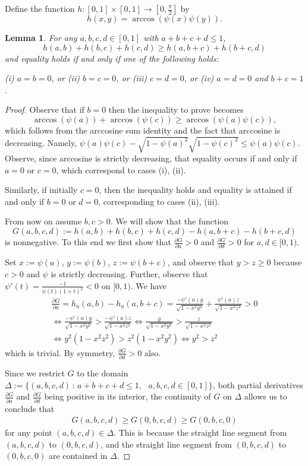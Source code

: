 \documentclass[reqno,hidelinks,11pt]{amsart}
\numberwithin{equation}{section}
\newtheorem{lemma}[theorem]{Lemma}
\begin{document}
Define the function $h:[0,1]\times[0,1]\to[0,\frac{\pi}{2}]$ by
\[
h(x,y)=\arccos(\psi(x)\psi(y)).
\]

\begin{lemma}\label{lemma: arccos triangle ieq}
    For any $a,b,c,d\in[0,1]$ with $a+b+c+d\le1$,
    \[
    h(a,b)+h(b,c)+h(c,d)\ge h(a,b+c)+h(b+c,d)
    \]
    and equality holds if and only if one of the following holds: 
    \begin{center}
    (i) $a=b=0$, or (ii) $b=c=0$, or (iii) $c=d=0$, or (iv) $a=d=0$ and $b+c=1$.
    \end{center}
\end{lemma}
\begin{proof}
Observe that if $b=0$ then the inequality to prove becomes 
\[
\arccos(\psi(a))+\arccos(\psi(c))\ge\arccos(\psi(a)\psi(c)),
\] 
which follows from the arccosine sum identity and the fact that arccosine is decreasing. Namely, $\psi(a)\psi(c)-\sqrt{1-\psi(a)^2}\sqrt{1-\psi(c)^2}\le \psi(a)\psi(c)$. Observe, since arccosine is strictly decreasing, that equality occurs if and only if $a=0$ or $c=0$, which correspond to cases (i), (ii). 

Similarly, if initially $c=0$, then the inequality holds and equality is attained if and only if $b=0$ or $d=0$, corresponding to cases (ii), (iii). 

From now on assume $b,c>0$. We will show that the function 
\[
G(a,b,c,d):=h(a,b)+h(b,c)+h(c,d)-h(a,b+c)-h(b+c,d)
\]
is nonnegative. To this end we first show that $\frac{\partial G}{\partial a}>0$ and $\frac{\partial G}{\partial d}>0$ for $a,d\in[0,1)$.

Set $x:=\psi(a)$, $y:=\psi(b)$, $z:=\psi(b+c)$, and observe that $y>z\ge0$ because $c>0$ and $\psi$ is strictly decreasing. Further, observe that $\psi'(t)=\frac{-1}{\psi(t)(1+t)^2}<0$ on $[0,1)$. We have
\begin{align*}
\frac{\partial G}{\partial a}=h_a(a,b)-h_a(a,b+c)=\frac{-\psi'(a)y}{\sqrt{1-x^2y^2}}+\frac{\psi'(a)z}{\sqrt{1-x^2z^2}}>0\\
\Leftrightarrow \frac{-\psi'(a)y}{\sqrt{1-x^2y^2}}>\frac{-\psi'(a)z}{\sqrt{1-x^2z^2}}
\Leftrightarrow \frac{y}{\sqrt{1-x^2y^2}}>\frac{z}{\sqrt{1-x^2z^2}}\\
\Leftrightarrow y^2(1-x^2z^2)>z^2(1-x^2y^2)
\Leftrightarrow y^2>z^2
\end{align*}
which is trivial. By symmetry, $\frac{\partial G}{\partial d}>0$ also.

Since we restrict $G$ to the domain $\Delta:=\{(a,b,c,d)\,:\,a+b+c+d\le1,\,\,\,\, a,b,c,d\in[0,1]\}$, both partial derivatives $\frac{\partial G}{\partial a}$ and $\frac{\partial G}{\partial d}$ being positive in its interior, the continuity of $G$ on $\Delta$ allows us to conclude that
\begin{align}\label{eqtn: G}
G(a,b,c,d)\ge G(0,b,c,d)\ge G(0,b,c,0)
\end{align}
for any point $(a,b,c,d)\in\Delta$. This is because the straight line segment from $(a,b,c,d)$ to $(0,b,c,d)$, and the straight line segment from $(0,b,c,d)$ to $(0,b,c,0)$ are contained in $\Delta$.


\end{proof}
\end{document}
